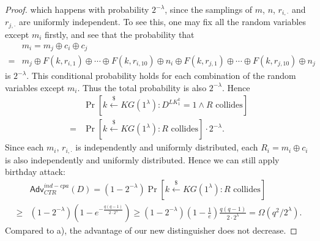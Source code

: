 \documentclass[12pt]{article}
\newcommand{\getsr}{\stackrel{\$}{\gets}}
\newcommand{\Adv}{\textsf{Adv}}
\theoremstyle{definition}
\begin{document}
\begin{proof}
which happens with probability $2^{-\lambda}$, since the samplings of $m$, $n$, $r_{i,\cdot}$ and $r_{j,\cdot}$ are uniformly independent. To see this, one may fix all the random variables except $m_i$ firstly, and see that the probability that
$$\begin{aligned}
& m_i = m_j \oplus c_i \oplus c_j \\
=& m_j \oplus F(k, r_{i,1}) \oplus \cdots \oplus F(k, r_{i,10}) \oplus n_i \oplus F(k, r_{j,1}) \oplus \cdots \oplus F(k, r_{j,10}) \oplus n_j
\end{aligned}$$
is $2^{-\lambda}$. This conditional probability holds for each combination of the random variables except $m_i$. Thus the total probability is also $2^{-\lambda}$. 
Hence
$$\begin{aligned}
& \Pr[k \getsr KG(1^\lambda) : D^{LK_1^k}=1 \wedge \textrm{$R$ collides}] \\
=& \Pr[k \getsr KG(1^\lambda): \textrm{$R$ collides}]\cdot 2^{-\lambda}. 
\end{aligned}$$
Since each $m_i$, $r_{i,\cdot}$ is independently and uniformly distributed, each $R_i = m_i \oplus c_i$ is also independently and uniformly distributed. Hence we can still apply birthday attack:
$$\begin{aligned}
& \Adv_{CTR}^{ind-cpa}(D) = (1-2^{-\lambda}) \Pr[k \getsr KG(1^\lambda): \textrm{$R$ collides}] \\
\geq & (1-2^{-\lambda})(1-e^{-\frac{q(q-1)}{2\cdot 2^\lambda}}) \geq (1-2^{-\lambda})(1-\frac{1}{e})\frac{q(q-1)}{2\cdot 2^\lambda}
= \Omega(q^2/2^\lambda).
\end{aligned}$$
Compared to a), the advantage of our new distinguisher does not decrease.
\end{proof}
\end{document}
